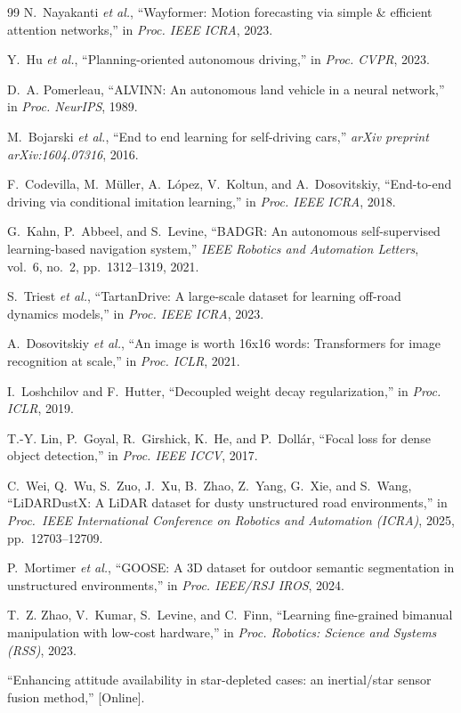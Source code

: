 \documentclass[sensors,article,submit,pdftex,moreauthors]{Definitions/mdpi}
\begin{document}
\begin{thebibliography}{99}
N.~Nayakanti \textit{et al.}, ``Wayformer: Motion forecasting via simple \& efficient attention networks,'' in \textit{Proc. IEEE ICRA}, 2023.

Y.~Hu \textit{et al.}, ``Planning-oriented autonomous driving,'' in \textit{Proc. CVPR}, 2023.

D.~A. Pomerleau, ``ALVINN: An autonomous land vehicle in a neural network,'' in \textit{Proc. NeurIPS}, 1989.

M.~Bojarski \textit{et al.}, ``End to end learning for self-driving cars,'' \textit{arXiv preprint arXiv:1604.07316}, 2016.

F.~Codevilla, M.~M{\"u}ller, A.~L{\'o}pez, V.~Koltun, and A.~Dosovitskiy, ``End-to-end driving via conditional imitation learning,'' in \textit{Proc. IEEE ICRA}, 2018.

G.~Kahn, P.~Abbeel, and S.~Levine, ``BADGR: An autonomous self-supervised learning-based navigation system,'' \textit{IEEE Robotics and Automation Letters}, vol.~6, no.~2, pp.~1312--1319, 2021.

S.~Triest \textit{et al.}, ``TartanDrive: A large-scale dataset for learning off-road dynamics models,'' in \textit{Proc. IEEE ICRA}, 2023.

A.~Dosovitskiy \textit{et al.}, ``An image is worth 16x16 words: Transformers for image recognition at scale,'' in \textit{Proc. ICLR}, 2021.

I.~Loshchilov and F.~Hutter, ``Decoupled weight decay regularization,'' in \textit{Proc. ICLR}, 2019.

T.-Y. Lin, P.~Goyal, R.~Girshick, K.~He, and P.~Doll{\'a}r, ``Focal loss for dense object detection,'' in \textit{Proc. IEEE ICCV}, 2017.

C.~Wei, Q.~Wu, S.~Zuo, J.~Xu, B.~Zhao, Z.~Yang, G.~Xie, and S.~Wang, ``LiDARDustX: A LiDAR dataset for dusty unstructured road environments,'' in \textit{Proc.\ IEEE International Conference on Robotics and Automation (ICRA)}, 2025, pp.~12703--12709.

P.~Mortimer \textit{et al.}, ``GOOSE: A 3D dataset for outdoor semantic segmentation in unstructured environments,'' in \textit{Proc. IEEE/RSJ IROS}, 2024.

T.~Z. Zhao, V.~Kumar, S.~Levine, and C.~Finn, ``Learning fine-grained bimanual manipulation with low-cost hardware,'' in \textit{Proc. Robotics: Science and Systems (RSS)}, 2023.

``Enhancing attitude availability in star-depleted cases: an inertial/star sensor fusion method,'' [Online].

\end{thebibliography}
\end{document}
